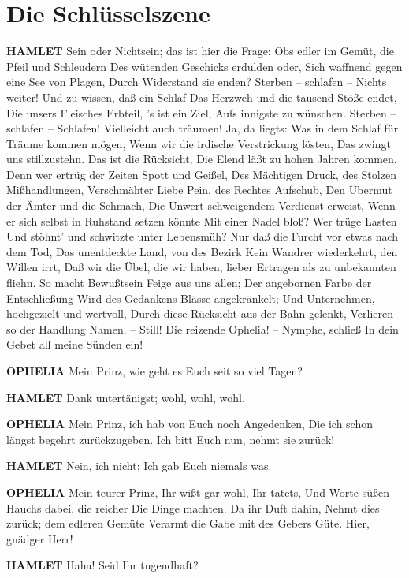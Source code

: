 \chapter{Die Schlüsselszene}

\textbf{HAMLET}
Sein oder Nichtsein; das ist hier die Frage:
Obs edler im Gemüt, die Pfeil und Schleudern
Des wütenden Geschicks erdulden oder,
Sich waffnend gegen eine See von Plagen,
Durch Widerstand sie enden? Sterben -- schlafen --
Nichts weiter! Und zu wissen, daß ein Schlaf
Das Herzweh und die tausend Stöße endet,
Die unsers Fleisches Erbteil, 's ist ein Ziel,
Aufs innigste zu wünschen. Sterben -- schlafen --
Schlafen! Vielleicht auch träumen! Ja, da liegts:
Was in dem Schlaf für Träume kommen mögen,
Wenn wir die irdische Verstrickung lösten,
Das zwingt uns stillzustehn. Das ist die Rücksicht,
Die Elend läßt zu hohen Jahren kommen.
Denn wer ertrüg der Zeiten Spott und Geißel,
Des Mächtigen Druck, des Stolzen Mißhandlungen,
Verschmähter Liebe Pein, des Rechtes Aufschub,
Den Übermut der Ämter und die Schmach,
Die Unwert schweigendem Verdienst erweist,
Wenn er sich selbst in Ruhstand setzen könnte
Mit einer Nadel bloß? Wer trüge Lasten
Und stöhnt' und schwitzte unter Lebensmüh?
Nur daß die Furcht vor etwas nach dem Tod,
Das unentdeckte Land, von des Bezirk
Kein Wandrer wiederkehrt, den Willen irrt,
Daß wir die Übel, die wir haben, lieber
Ertragen als zu unbekannten fliehn.
So macht Bewußtsein Feige aus uns allen;
Der angebornen Farbe der Entschließung
Wird des Gedankens Blässe angekränkelt;
Und Unternehmen, hochgezielt und wertvoll,
Durch diese Rücksicht aus der Bahn gelenkt,
Verlieren so der Handlung Namen. -- Still!
Die reizende Ophelia! -- Nymphe, schließ
In dein Gebet all meine Sünden ein!

\textbf{OPHELIA}
Mein Prinz, wie geht es Euch seit so viel Tagen?

\textbf{HAMLET}
Dank untertänigst; wohl, wohl, wohl.

\textbf{OPHELIA}
Mein Prinz, ich hab von Euch noch Angedenken,
Die ich schon längst begehrt zurückzugeben.
Ich bitt Euch nun, nehmt sie zurück!

\textbf{HAMLET}
Nein, ich nicht;
Ich gab Euch niemals was.

\textbf{OPHELIA}
Mein teurer Prinz, Ihr wißt gar wohl, Ihr tatets,
Und Worte süßen Hauchs dabei, die reicher
Die Dinge machten. Da ihr Duft dahin,
Nehmt dies zurück; dem edleren Gemüte
Verarmt die Gabe mit des Gebers Güte.
Hier, gnädger Herr!

\textbf{HAMLET}
Haha! Seid Ihr tugendhaft?

